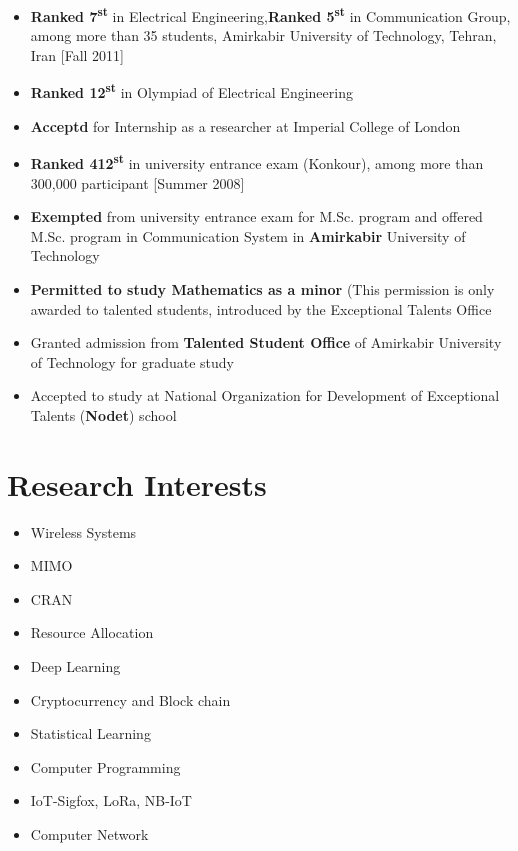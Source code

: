 \documentclass[10pt,a4paper,sans]{moderncv} %
\begin{document}
\begin{itemize}
\item \textbf{Ranked 7\textsuperscript{st}} in Electrical Engineering,\textbf{Ranked 5\textsuperscript{st}} in Communication Group, among more than 35 students,
Amirkabir University of Technology, Tehran, Iran [Fall 2011]
\item \textbf{Ranked 12\textsuperscript{st}} in Olympiad of Electrical Engineering
\item \textbf {Acceptd}  for Internship as a researcher at Imperial College of London
\item \textbf{Ranked 412\textsuperscript{st}} in university entrance exam (Konkour), among more than 300,000
participant [Summer 2008]
\item \textbf{Exempted} from university entrance exam for M.Sc. program and offered M.Sc. program in Communication System in \textbf{Amirkabir} University of Technology
\item \textbf{Permitted to study Mathematics as a minor} (This permission is only awarded to talented students, introduced by the Exceptional Talents Office
\item Granted admission from \textbf{Talented Student Office} of Amirkabir University of Technology for graduate
study
\item Accepted to study at National Organization for Development of Exceptional Talents (\textbf{Nodet}) school
\end{itemize}

\section{Research Interests}

\begin{itemize}
\item{Wireless Systems}
\item{MIMO}
\item{CRAN}
\item{Resource Allocation}
\item{Deep Learning}
\item{Cryptocurrency and Block chain}
\item{Statistical Learning}
\item{Computer Programming}
\item{IoT-Sigfox, LoRa, NB-IoT}
\item{Computer Network}
\end{itemize}
\end{document}
